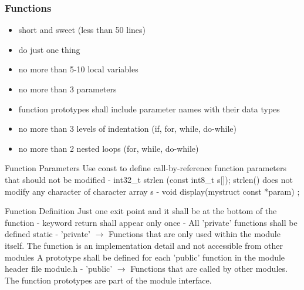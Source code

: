 \multend

\subsubsection{Functions}


\begin{remark}
    \begin{itemize}
        \item short and sweet (less than 50 lines)
        \item do just one thing
        \item no more than 5-10 local variables
        \item no more than 3 parameters
        \item function prototypes shall include parameter names with their data types
        \item no more than 3 levels of indentation (if, for, while, do-while)
        \item no more than 2 nested loops (for, while, do-while)
    \end{itemize}
\end{remark}

\begin{definition}{Function Parameters}
    Use const to define call-by-reference function parameters that should not be modified
- int32\_t strlen (const int8\_t s[]);
strlen() does not modify any character of character array s
- void display(mystruct const *param) ;
\end{definition}

\begin{definition}{Function Definition}
Just one exit point and it shall be at the bottom of the function
- keyword return shall appear only once
- All 'private' functions shall be defined static
- 'private' $\rightarrow$ Functions that are only used within the module itself. The function is an implementation detail and not accessible from other modules
A prototype shall be defined for each 'public' function in the module header file module.h
- 'public' $\rightarrow$ Functions that are called by other modules. The function prototypes are part of the module interface.
\end{definition}

